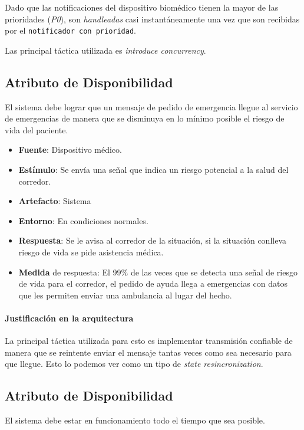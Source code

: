 Dado que las notificaciones del dispositivo biomédico tienen la mayor de las prioridades (\emph{P0}), son \emph{handleadas} casi instantáneamente una vez que son recibidas por el \texttt{notificador con prioridad}. 

Las principal táctica utilizada es \emph{introduce concurrency}. 

\subsection{Atributo de Disponibilidad}

El sistema debe lograr que un mensaje de pedido de emergencia llegue al servicio de emergencias de manera que se disminuya en lo mínimo posible el riesgo de vida del paciente.

\begin{itemize}
  \item \textbf{Fuente}: Dispositivo médico.
  \item \textbf{Estímulo}: Se envía una señal que indica un riesgo potencial a la salud del corredor.
  \item \textbf{Artefacto}: Sistema
  \item \textbf{Entorno}: En condiciones normales.
  \item \textbf{Respuesta}: Se le avisa al corredor de la situación, si la situación conlleva riesgo de vida se pide asistencia médica.
  \item \textbf{Medida} de respuesta: El 99\% de las veces que se detecta una señal de riesgo de vida para el corredor, el pedido de ayuda llega a emergencias con datos que les permiten enviar una ambulancia al lugar del hecho.
\end{itemize}

\paragraph{Justificación en la arquitectura}

La principal táctica utilizada para esto es implementar transmisión confiable de manera que se reintente enviar
el mensaje tantas veces como sea necesario para que llegue. Esto lo podemos ver como un tipo de \textit{state
resincronization}. 

\subsection{Atributo de Disponibilidad}
El sistema debe estar en funcionamiento todo el tiempo que sea posible.

